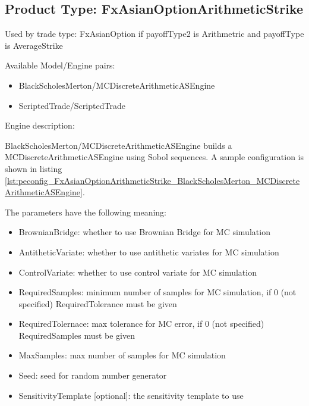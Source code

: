 \subsection{Product Type: FxAsianOptionArithmeticStrike}

Used by trade type: FxAsianOption if payoffType2 is Arithmetric and payoffType is AverageStrike

Available Model/Engine pairs:

\begin{itemize}
\item BlackScholesMerton/MCDiscreteArithmeticASEngine
\item ScriptedTrade/ScriptedTrade
\end{itemize}
  
Engine description:

BlackScholesMerton/MCDiscreteArithmeticASEngine builds a MCDiscreteArithmeticASEngine using Sobol sequences. A sample
configuration is shown in listing
\ref{lst:peconfig_FxAsianOptionArithmeticStrike_BlackScholesMerton_MCDiscreteArithmeticASEngine}.

The parameters have the following meaning:

\begin{itemize}
\item BrownianBridge: whether to use Brownian Bridge for MC simulation
\item AntitheticVariate: whether to use antithetic variates for MC simulation
\item ControlVariate: whether to use control variate for MC simulation
\item RequiredSamples: minimum number of samples for MC simulation, if 0 (not specified) RequiredTolerance must be given
\item RequiredTolernace: max tolerance for MC error, if 0 (not specified) RequiredSamples must be given
\item MaxSamples: max number of samples for MC simulation
\item Seed: seed for random number generator
\item SensitivityTemplate [optional]: the sensitivity template to use 
\end{itemize}

